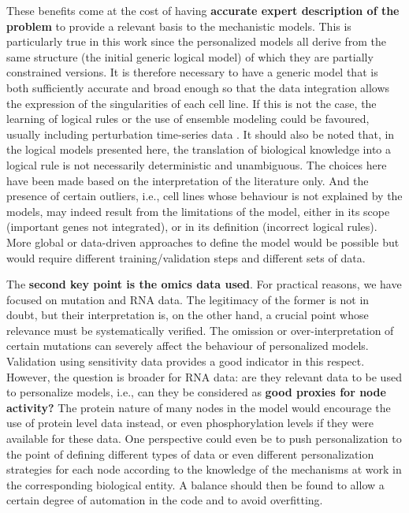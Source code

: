 \documentclass[a4paper,12pt,twoside,onecolumn,openright,final,oldfontcommands]{memoir}
\begin{document}
These benefits come at the cost of having \textbf{accurate expert
description of the problem} to provide a relevant basis to the
mechanistic models. This is particularly true in this work since the
personalized models all derive from the same structure (the initial
generic logical model) of which they are partially constrained versions.
It is therefore necessary to have a generic model that is both
sufficiently accurate and broad enough so that the data integration
allows the expression of the singularities of each cell line. If this is
not the case, the learning of logical rules or the use of ensemble
modeling could be favoured, usually including perturbation time-series
data \citep{razzaq2018computational}. It should also be noted that, in
the logical models presented here, the translation of biological
knowledge into a logical rule is not necessarily deterministic and
unambiguous. The choices here have been made based on the interpretation
of the literature only. And the presence of certain outliers, i.e., cell
lines whose behaviour is not explained by the models, may indeed result
from the limitations of the model, either in its scope (important genes
not integrated), or in its definition (incorrect logical rules). More
global or data-driven approaches to define the model would be possible
but would require different training/validation steps and different sets
of data.

The \textbf{second key point is the omics data used}. For practical
reasons, we have focused on mutation and RNA data. The legitimacy of the
former is not in doubt, but their interpretation is, on the other hand,
a crucial point whose relevance must be systematically verified. The
omission or over-interpretation of certain mutations can severely affect
the behaviour of personalized models. Validation using sensitivity data
provides a good indicator in this respect. However, the question is
broader for RNA data: are they relevant data to be used to personalize
models, i.e., can they be considered as \textbf{good proxies for node
activity?} The protein nature of many nodes in the model would encourage
the use of protein level data instead, or even phosphorylation levels if
they were available for these data. One perspective could even be to
push personalization to the point of defining different types of data or
even different personalization strategies for each node according to the
knowledge of the mechanisms at work in the corresponding biological
entity. A balance should then be found to allow a certain degree of
automation in the code and to avoid overfitting.
\end{document}
